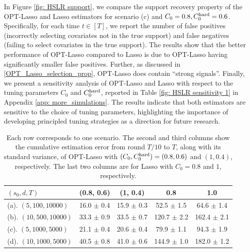 \documentclass[aos,preprint]{imsart}
\theoremstyle{plain}
\theoremstyle{definition}
\begin{document}
In Figure \ref{fig: HSLR support}, we compare the support recovery property of the OPT-Lasso and Lasso estimators for scenario (c) and $C_0=0.8, C_0^{\textup{hard}}=0.6$. Specifically, for each time $t \in [T]$, we report the number of false positives (incorrectly selecting covariates not in the true support) and false negatives (failing to select covariates in the true support). The results show that the better performance of OPT-Lasso compared to Lasso is due to OPT-Lasso having significantly smaller false positives. Further, as discussed in \eqref{OPT_Lasso_selection_prop}, OPT-Lasso does contain ``strong signals''. Finally, we present a sensitivity analysis of OPT-Lasso and Lasso with respect to the tuning parameters $C_0$ and $C_0^{\textup{hard}}$, reported in Table \ref{fig: HSLR sensitivity 1} in Appendix \ref{app: more_simulations}. The results indicate that both estimators are sensitive to the choice of tuning parameters, highlighting the importance of developing principled tuning strategies as a direction for future research.






\begin{table}[t!]
\centering
\caption{Each row corresponds to one scenario. The second and third columns show the cumulative estimation error from round $T/10$ to $T$, along with its standard variance, of OPT-Lasso with 
$(C_0,C_0^{\textup{hard}}) = (0.8,0.6)$ and $(1,0.4)$,  respectively.
The last two columns are for  Lasso with $C_0=0.8$ and $1$, respectively.
} \label{fig: HSLR compare}
\begin{tabular}{l|cc|cc}
  $(s_0,d,T)$   & (0.8, 0.6) & (1, 0.4)   & 0.8         & 1.0           \\ \hline
(a). $(5,100,10000)$ & 16.0 $\pm$ 0.4   & 15.9 $\pm$ 0.3 & 52.5 $\pm$ 1.5  & 64.6 $\pm$ 1.4  \\
(b). $(10,500,10000)$ & 33.3 $\pm$ 0.9 & 33.5 $\pm$ 0.7 & 120.7 $\pm$ 2.2 & 162.4 $\pm$ 2.1 \\
(c). $(5,1000,5000)$ & 21.1 $\pm$ 0.4 & 20.6 $\pm$ 0.4 & 79.9 $\pm$ 1.1  & 94.3 $\pm$ 1.9  \\
(d). $(10,1000,5000)$  & 40.5 $\pm$ 0.8 & 41.0 $\pm$ 0.6   & 144.9 $\pm$ 1.0   & 182.0 $\pm$ 1.2   \\  
\end{tabular}
\end{table}
\end{document}
